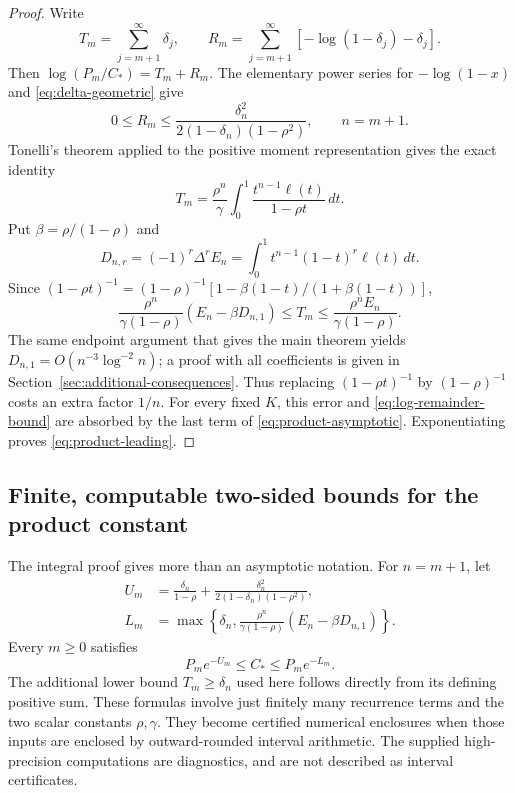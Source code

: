 \begin{proof}
Write
\[
 T_m=\sum_{j=m+1}^\infty\delta_j,\qquad
 R_m=\sum_{j=m+1}^\infty[-\log(1-\delta_j)-\delta_j].
\]
Then $\log(P_m/C_*)=T_m+R_m$. The elementary power series for
$-\log(1-x)$ and \eqref{eq:delta-geometric} give
\begin{equation}\label{eq:log-remainder-bound}
 0\le R_m\le
 \frac{\delta_n^2}{2(1-\delta_n)(1-\rho^2)},\qquad n=m+1.
\end{equation}
Tonelli's theorem applied to the positive moment representation gives
the exact identity
\begin{equation}\label{eq:product-tail-integral}
 T_m=\frac{\rho^n}{\gamma}
       \int_0^1\frac{t^{n-1}\ell(t)}{1-\rho t}\,dt.
\end{equation}
Put $\beta=\rho/(1-\rho)$ and
\begin{equation}\label{eq:D-def}
 D_{n,r}=(-1)^r\Delta^r E_n
        =\int_0^1t^{n-1}(1-t)^r\ell(t)\,dt.
\end{equation}
Since $(1-\rho t)^{-1}=(1-\rho)^{-1}
[1-\beta(1-t)/(1+\beta(1-t))]$,
\begin{equation}\label{eq:tail-first-sandwich}
 \frac{\rho^n}{\gamma(1-\rho)}(E_n-\beta D_{n,1})
 \le T_m\le\frac{\rho^n E_n}{\gamma(1-\rho)}.
\end{equation}
The same endpoint argument that gives the main theorem yields
$D_{n,1}=O(n^{-3}\log^{-2}n)$; a proof with all coefficients is
given in Section~\ref{sec:additional-consequences}. Thus replacing
$(1-\rho t)^{-1}$ by $(1-\rho)^{-1}$ costs an extra factor $1/n$.
For every fixed $K$, this error and \eqref{eq:log-remainder-bound}
are absorbed by the last term of \eqref{eq:product-asymptotic}.
Exponentiating proves \eqref{eq:product-leading}.
\end{proof}

\subsection{Finite, computable two-sided bounds for the product constant}

The integral proof gives more than an asymptotic notation. For $n=m+1$,
let
\begin{align}\label{eq:product-finite-bounds}
 U_m&=\frac{\delta_n}{1-\rho}
       +\frac{\delta_n^2}{2(1-\delta_n)(1-\rho^2)},\nonumber\\
 L_m&=\max\left\{\delta_n,
   \frac{\rho^n}{\gamma(1-\rho)}(E_n-\beta D_{n,1})\right\}.
\end{align}
Every $m\ge0$ satisfies
\begin{equation}\label{eq:C-enclosure}
 \boxed{\qquad P_m e^{-U_m}\le C_*\le P_m e^{-L_m}.\qquad}
\end{equation}
The additional lower bound $T_m\ge\delta_n$ used here follows directly
from its defining positive sum. These formulas involve just finitely
many recurrence terms and the two scalar constants $\rho,\gamma$.
They become certified numerical enclosures when those inputs are
enclosed by outward-rounded interval arithmetic. The supplied
high-precision computations are diagnostics, and are not described
as interval certificates.

